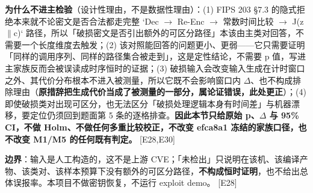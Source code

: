 \documentclass[UTF8,fontset=fandol,11pt,a4paper]{ctexart}
\begin{document}
\textbf{为什么不进主检验}（设计性理由，不是数据性理由）：(1) FIPS 203 §7.3 的隐式拒绝本来就不论密文是否合法都走完整 `Dec \texorpdfstring{$\rightarrow$}{->} Re-Enc \texorpdfstring{$\rightarrow$}{->} 常数时间比较 \texorpdfstring{$\rightarrow$}{->} J(z\texorpdfstring{$\|$}{||}c)` 路径，所以「破损密文是否引出额外的可区分路径」本该由主类对回答，不需要一个长度维度去触发；(2) 该对照能回答的问题更小、更弱——它只需要证明「同样的调用序列、同样的路径集合被走到」，这是定性结论，不需要 p 值，写进主家族反而会被误读成时序恒时的证据；(3) 破损输入会改变输入生成在计时窗口之外、其代价分布根本不进入被测量，所以它既不会影响窗口内 \texorpdfstring{$\Delta$}{Delta}、也不构成排除理由（\textbf{原措辞把生成代价当成了被测量的一部分，属论证错误，此处更正}）；(4) 即使破损类对出现可区分，也无法区分「破损处理逻辑本身有时间差」与机器漂移，要定位仍须回到题面第 5 条的逐格排查。\textbf{因此本节只给原始 p、\texorpdfstring{$\Delta$}{Delta} 与 95\% CI，不做 Holm、不做任何多重比较校正，不改变 efca8a1 冻结的家族口径，也不改变 M1/M5 的任何既有判定。} [E28,E30]


\textbf{边界}：输入是人工构造的，这不是上游 CVE；「未检出」只说明在该机、该编译产物、该类对、该样本预算下没有额外的可区分路径，\textbf{不构成恒时证明}，也不给出总体误报率。本项目不做密钥恢复，不运行 exploit demo。 [E28]
\end{document}
